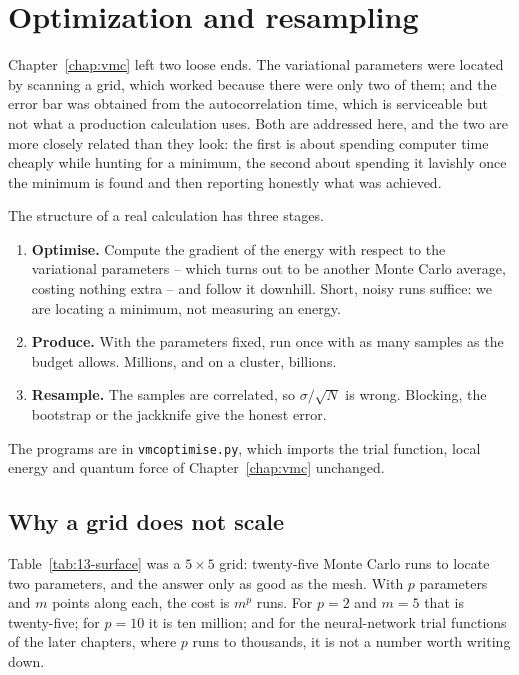 \chapter{Optimization and resampling}
\label{chap:optimres}

Chapter~\ref{chap:vmc} left two loose ends.  The variational parameters were
located by scanning a grid, which worked because there were only two of them;
and the error bar was obtained from the autocorrelation time, which is
serviceable but not what a production calculation uses.  Both are addressed
here, and the two are more closely related than they look: the first is about
spending computer time cheaply while hunting for a minimum, the second about
spending it lavishly once the minimum is found and then reporting honestly
what was achieved.

The structure of a real calculation has three stages.

\begin{svgraybox}
\begin{enumerate}
\item \textbf{Optimise.}  Compute the gradient of the energy with respect to
  the variational parameters -- which turns out to be another Monte Carlo
  average, costing nothing extra -- and follow it downhill.  Short, noisy runs
  suffice: we are locating a minimum, not measuring an energy.
\item \textbf{Produce.}  With the parameters fixed, run once with as many
  samples as the budget allows.  Millions, and on a cluster, billions.
\item \textbf{Resample.}  The samples are correlated, so
  $\sigma/\sqrt{N}$ is wrong.  Blocking, the bootstrap or the jackknife give
  the honest error.
\end{enumerate}
\end{svgraybox}

\noindent
The programs are in \texttt{vmcoptimise.py}, which imports the trial function,
local energy and quantum force of Chapter~\ref{chap:vmc} unchanged.

\section{Why a grid does not scale}
\label{sec:optgrid}

Table~\ref{tab:13-surface} was a $5\times5$ grid: twenty-five Monte Carlo runs
to locate two parameters, and the answer only as good as the mesh.  With $p$
parameters and $m$ points along each, the cost is $m^p$ runs.  For $p=2$ and
$m=5$ that is twenty-five; for $p=10$ it is ten million; and for the
neural-network trial functions of the later chapters, where $p$ runs to
thousands, it is not a number worth writing down.

